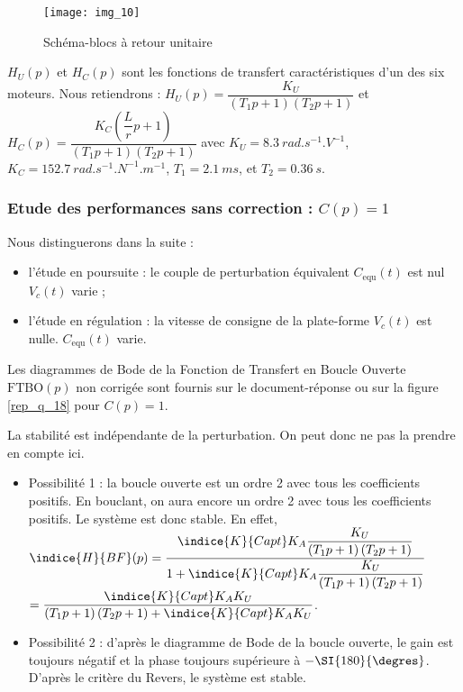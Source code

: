 \begin{figure}[H]
\centering
\texttt{[image: img\_10]}
\caption{Schéma-blocs à retour unitaire\label{img:10}}
\end{figure}

$H_U( p)$ et $H_C( p)$ sont les fonctions de transfert caractéristiques d’un des six moteurs. Nous retiendrons :
$H_U(p)=\dfrac{K_U}{\left(T_1p +1\right)\left(T_2p +1\right)}$ et $H_C(p)=\dfrac{K_C\left(\dfrac{L}{r}p +1\right)}{\left(T_1p +1\right)\left(T_2p +1\right)}$
avec 
$K_U = \SI{8,3}{rad . s ^{-1}.V ^{-1}}$, 
$K_C = \SI{152,7}{rad . s^{-1}.N^{-1} .m^{-1}}$, 
$T_1=\SI{2,1}{ms}$, 
et $T_2 =\SI{0,36}{s}$.

\subsubsection{Etude des performances sans correction : $C( p) =1$}
Nous distinguerons dans la suite :
\begin{itemize}
\item l’étude en poursuite : le couple de perturbation équivalent $C_{\text{equ}} (t)$ est nul $V_c (t)$ varie ;
\item l’étude en régulation : la vitesse de consigne de la plate-forme $V_c (t)$ est nulle. $C_{\text{equ}}(t)$ varie.
\end{itemize}

Les diagrammes de Bode de la Fonction de Transfert en Boucle Ouverte $\text{FTBO}( p)$ non corrigée sont fournis sur le document-réponse ou sur la figure \ref{rep_q_18} pour $C( p) = 1$.

\ifprof
\begin{corrige}
La stabilité est indépendante de la perturbation. On peut donc ne pas la prendre en compte ici. 
\begin{itemize}
\item Possibilité 1 : la boucle ouverte est un ordre 2 avec tous les coefficients positifs. En bouclant, on aura encore un ordre 2 avec tous les coefficients positifs. Le système est donc stable. En effet, 
$\indice{H}{BF}(p)=\dfrac{\indice{K}{Capt}K_A\dfrac{K_U}{\left(T_1p +1\right)\left(T_2p +1\right)}}{1+\indice{K}{Capt}K_A\dfrac{K_U}{\left(T_1p +1\right)\left(T_2p +1\right)}}$
$=\dfrac{\indice{K}{Capt}K_AK_U}{\left(T_1p +1\right)\left(T_2p +1\right)+\indice{K}{Capt}K_AK_U}$.
\item Possibilité 2 : d'après le diagramme de Bode de la boucle ouverte, le gain est toujours négatif et la phase toujours supérieure à $-\SI{180}{\degres}$. D'après le critère du Revers, le système est stable.  
\end{itemize}
\end{corrige}
\else

